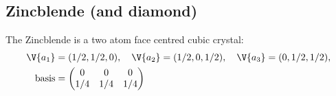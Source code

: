 \documentclass[main.tex]{subfiles}
\begin{document}
	\subsection*{Zincblende (and diamond)}
	The Zincblende is a two atom face centred cubic crystal:
	\begin{align*}
		\V{a_1} &= (1/2, 1/2, 0), \quad \V{a_2} = (1/2, 0, 1/2), \quad \V{a_3} = (0, 1/2, 1/2), \\
		\text{basis} &= \begin{pmatrix}
		0 & 0 & 0 \\
		1/4 & 1/4 & 1/4
		\end{pmatrix}
	\end{align*}
\end{document}
